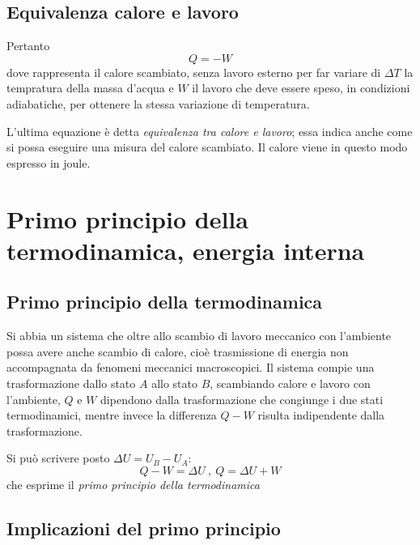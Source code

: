 \documentclass[class=book, crop=false, oneside, 12pt]{standalone}
\begin{document}
\subsection{Equivalenza calore e lavoro}

Pertanto 
\begin{equation}
    Q = -W
\end{equation}
dove rappresenta il calore scambiato, senza lavoro esterno per far variare di \(\Delta T\) la tempratura della massa d'acqua e \(W\) il lavoro che deve essere speso, in condizioni adiabatiche, per ottenere la stessa variazione di temperatura. 

L'ultima equazione è detta \emph{equivalenza tra calore e lavoro}; essa indica anche come si possa eseguire una misura del calore scambiato. 
Il calore viene in questo modo espresso in joule.

\section{Primo principio della termodinamica, energia interna}

\subsection{Primo principio della termodinamica}

Si abbia un sistema che oltre allo scambio di lavoro meccanico con l'ambiente possa avere anche scambio di calore, cioè trasmissione di energia non accompagnata da fenomeni meccanici macroscopici.
Il sistema compie una trasformazione dallo stato \(A\) allo stato \(B\), scambiando calore e lavoro con l'ambiente, \(Q\) e \(W\) dipendono dalla trasformazione che congiunge i due stati termodinamici, mentre invece la differenza \(Q-W\) risulta indipendente dalla trasformazione. 

Si può scrivere posto \(\Delta U = U_B - U_A\):
\begin{equation}
    Q - W = \Delta U \ , \ Q = \Delta U + W
\end{equation}
che esprime il \emph{primo principio della termodinamica}

\subsection{Implicazioni del primo principio}
\end{document}
